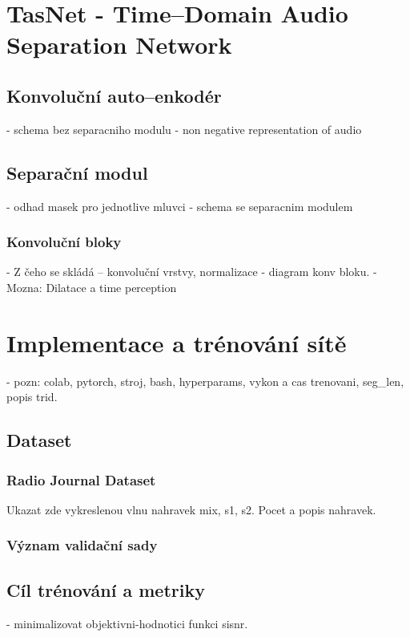 \chapter{TasNet - Time--Domain Audio Separation Network}
\label{tasnet}

\section{Konvoluční auto--enkodér}
- schema bez separacniho modulu
- non negative representation of audio

\section{Separační modul}
- odhad masek pro jednotlive mluvci
- schema se separacnim modulem

\subsection{Konvoluční bloky}
- Z čeho se skládá -- konvoluční vrstvy, normalizace
- diagram konv bloku.
- Mozna: Dilatace a time perception




\chapter{Implementace a trénování sítě}
\label{implementace}
- pozn: colab, pytorch, stroj, bash, hyperparams, vykon a cas trenovani, seg_len, popis trid.

\section{Dataset}
\subsection{Radio Journal Dataset}
Ukazat zde vykreslenou vlnu nahravek mix, s1, s2.
Pocet a popis nahravek.

\subsection{Význam validační sady}

\section{Cíl trénování a metriky}
- minimalizovat objektivni-hodnotici funkci sisnr.
